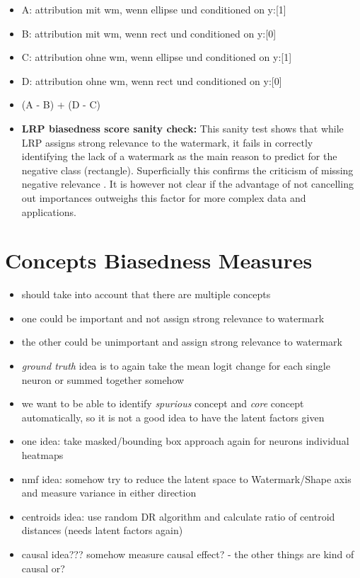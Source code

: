 \begin{itemize}
    \item A: attribution mit wm, wenn ellipse und conditioned on y:[1]
    \item B: attribution mit wm, wenn rect    und conditioned on y:[0]
    \item C: attribution ohne wm, wenn ellipse und conditioned on y:[1]
    \item D: attribution ohne wm, wenn rect    und conditioned on y:[0]
    \item (A - B) + (D - C)
    \item \textbf{LRP biasedness score sanity check:}
          This sanity test shows that while LRP assigns strong relevance to the watermark, it fails in correctly identifying the lack of a watermark as the main reason to predict for the negative class (rectangle). Superficially this confirms the criticism of missing negative relevance \cite{Sixt2020}. It is however not clear if the advantage of not cancelling out importances outweighs this factor for more complex data and applications.  


\end{itemize}

\section{Concepts Biasedness Measures}
\begin{itemize}
    \item should take into account that there are multiple concepts
    \item one could be important and not assign strong relevance to watermark
    \item the other could be unimportant and assign strong relevance to watermark
    \item \textit{ground truth} idea is to again take the mean logit change for each single neuron or summed together somehow
    \item we want to be able to identify \textit{spurious} concept and \textit{core} concept automatically, so it is not a good idea to have the latent factors given
    \item one idea: take masked/bounding box approach again for neurons individual heatmaps
    \item nmf idea: somehow try to reduce the latent space to Watermark/Shape axis and measure variance in either direction
    \item centroids idea: use random DR algorithm and calculate ratio of centroid distances (needs latent factors again)
    \item causal idea??? somehow measure causal effect? - the other things are kind of causal or?
\end{itemize}

